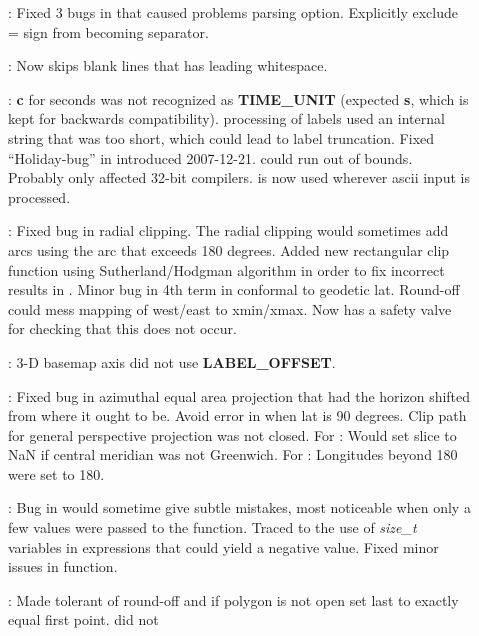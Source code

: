 \begin{description}
\item []:	Fixed 3 bugs in  that caused problems parsing 
option. Explicitly exclude = sign from becoming separator.
\item []: Now skips blank lines that has leading whitespace.
\item []: \textbf{c} for seconds was not recognized as \textbf{TIME\_UNIT} (expected \textbf{s},
which is kept for backwards compatibility).  processing of labels used an internal string that was too short,
which could lead to label truncation.  Fixed ``Holiday-bug'' in  introduced 2007-12-21.
 could run out of bounds. Probably only affected 32-bit compilers.
 is now used wherever ascii input is processed.
\item []: Fixed bug in radial clipping. The radial clipping would sometimes add arcs using the arc that
exceeds 180 degrees.  Added new rectangular clip function using Sutherland/Hodgman algorithm
in order to fix incorrect results in .  Minor bug in 4th term in conformal to geodetic lat.
Round-off could mess mapping of west/east to xmin/xmax.  Now has a safety valve for checking that this does not occur.
\item []: 3-D basemap axis did not use \textbf{LABEL\_OFFSET}.
\item []: Fixed bug in azimuthal equal area projection that had the
horizon shifted from where it ought to be.  Avoid error in  when lat is 90 degrees.
Clip path for general perspective projection was not closed. For : Would set slice to NaN if central meridian was not Greenwich.
For : Longitudes beyond 180 were set to 180.
\item []: Bug in  would sometime give subtle mistakes, most noticeable
when only a few values were passed to the function. Traced to the use
of \emph{size\_t} variables in expressions that could yield a negative value.
Fixed minor issues in  function.
\item []: Made  tolerant of round-off and if
polygon is not open set last to exactly equal first point.    did not

\end{description}
